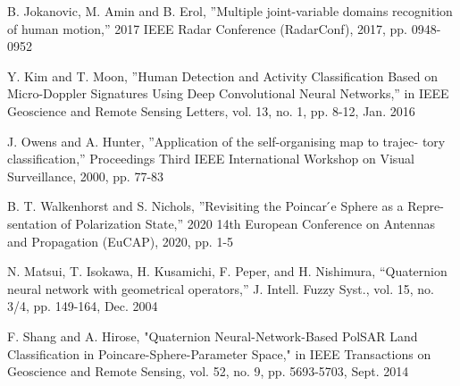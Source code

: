 \documentclass[uplatex,a4paper]{jsarticle}
\begin{document}
\newpage
\begin{thebibliography}{99}
		
	 B. Jokanovic, M. Amin and B. Erol, ”Multiple joint-variable domains recognition of human motion,” 2017 IEEE Radar Conference (RadarConf), 2017, pp. 0948- 0952
	
     Y. Kim and T. Moon, ”Human Detection and Activity Classification Based on Micro-Doppler Signatures Using Deep Convolutional Neural Networks,” in IEEE Geoscience and Remote Sensing Letters, vol. 13, no. 1, pp. 8-12, Jan. 2016
	
     J. Owens and A. Hunter, ”Application of the self-organising map to trajec- tory classification,” Proceedings Third IEEE International Workshop on Visual Surveillance, 2000, pp. 77-83

     B. T. Walkenhorst and S. Nichols, ”Revisiting the Poincar ́e Sphere as a Repre- sentation of Polarization State,” 2020 14th European Conference on Antennas and Propagation (EuCAP), 2020, pp. 1-5
	
     N. Matsui, T. Isokawa, H. Kusamichi, F. Peper, and H. Nishimura,
    “Quaternion neural network with geometrical operators,” J. Intell. Fuzzy
    Syst., vol. 15, no. 3/4, pp. 149-164, Dec. 2004

     F. Shang and A. Hirose, "Quaternion Neural-Network-Based PolSAR Land Classification in Poincare-Sphere-Parameter Space," in IEEE Transactions on Geoscience and Remote Sensing, vol. 52, no. 9, pp. 5693-5703, Sept. 2014
	    

\end{thebibliography}
\end{document}
